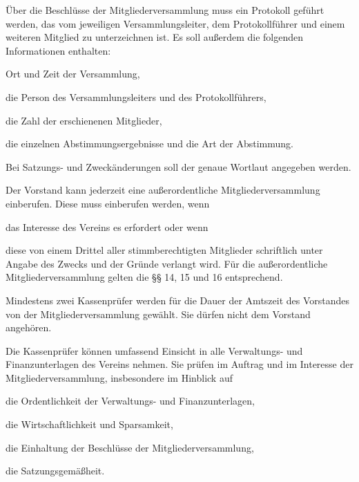 \begin{contract}
 Über die Beschlüsse der Mitgliederversammlung muss ein Protokoll geführt werden, das vom jeweiligen Versammlungsleiter, dem Protokollführer und einem weiteren Mitglied zu unterzeichnen ist.
	Es soll außerdem die folgenden Informationen enthalten:
	\begin{subpara}
		\item Ort und Zeit der Versammlung, 
		\item die Person des Versammlungsleiters und des Protokollführers, 
		\item die Zahl der erschienenen Mitglieder, 
		\item die einzelnen Abstimmungsergebnisse und die Art der Abstimmung. 
	\end{subpara}
	Bei Satzungs- und Zweckänderungen soll der genaue Wortlaut angegeben werden.

	
 Der Vorstand kann jederzeit eine außerordentliche Mitgliederversammlung einberufen. Diese muss einberufen werden, wenn

	\begin{subpara}
		\item das Interesse des Vereins es erfordert oder wenn
		\item diese von einem Drittel aller stimmberechtigten Mitglieder schriftlich unter Angabe des Zwecks und der Gründe verlangt wird.
		Für die außerordentliche Mitgliederversammlung gelten die §§ 14, 15 und 16 entsprechend.
	\end{subpara}

	
 Mindestens zwei Kassenprüfer werden für die Dauer der Amtszeit des Vorstandes von der Mitgliederversammlung gewählt. Sie dürfen nicht dem Vorstand angehören.
	
 Die Kassenprüfer können umfassend Einsicht in alle Verwaltungs- und Finanzunterlagen des Vereins nehmen. Sie prüfen im Auftrag und im Interesse der Mitgliederversammlung, insbesondere im Hinblick auf
	\begin{subpara}
		\item die Ordentlichkeit der Verwaltungs- und Finanzunterlagen,
		\item die Wirtschaftlichkeit und Sparsamkeit,
		\item die Einhaltung der Beschlüsse der Mitgliederversammlung,
		\item die Satzungsgemäßheit.
	\end{subpara}
	

\end{contract}
